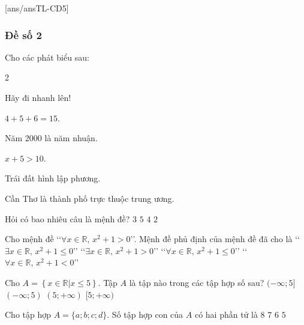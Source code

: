 [ans/ansTL-CD5]
\setcounter{ex}{0}
\subsubsection{Đề số 2}


\begin{ex}%
	Cho các phát biểu sau:
	\begin{enumerate}[1.]
	\end{enumerate}
	Hỏi có bao nhiêu câu là mệnh đề?
	\choice
	{$3$}
	{$5$}
	{\True $4$}
	{$2$}
	\loigiai{
	}
\end{ex}


\begin{ex}%
	Cho mệnh đề \lq\lq$\forall x\in \mathbb{R},\, x^2+1>0$\rq \rq. Mệnh đề phủ định của mệnh đề đã cho là
	\choice
	{\True \lq\lq$\exists x\in \mathbb{R},\, x^2+1\leq 0$\rq \rq}
	{\lq\lq$\exists x\in \mathbb{R},\, x^2+1>0$\rq \rq}
	{\lq\lq$\forall x\in \mathbb{R},\, x^2+1\leq 0$\rq \rq}
	{\lq\lq$\forall x\in \mathbb{R},\, x^2+1<0$\rq \rq}
\end{ex}

\begin{ex}%
	Cho $A=\left\{x \in \mathbb{R}|x \leq 5\right\}$. Tập $A$ là tập nào trong các tập hợp số sau?
	\choice
	{\True $(-\infty;5]$}
	{$(-\infty;5)$}
	{$(5;+\infty)$}
	{$[5;+\infty)$}
	\loigiai{
		Ta có $A=\left\{x \in \mathbb{R}|x \leq 5\right\}=(-\infty;5]$.}
\end{ex}

\begin{ex}%
	Cho tập hợp $A=\{a;b;c;d\}$. Số tập hợp con của $A$ có hai phần tử là
	\choice
	{$8$}
	{$7$}
	{\True $6$}
	{$5$}
\end{ex}

